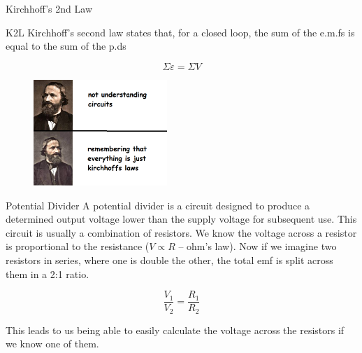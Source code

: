 \documentclass[../Main.tex]{subfiles}
\begin{document}
\begin{frame}{Kirchhoff's 2nd Law}
    \begin{block}{K2L}
    Kirchhoff's second law states that, for a closed loop, the sum of the e.m.fs is equal to the sum of the p.ds
    
    \begin{equation*}
        \Sigma \varepsilon = \Sigma V
    \end{equation*}
    \end{block}
    
    \begin{figure}
        \centering
        \includegraphics[height=4cm]{Electricity_Images/kirchoffs_laws_meme.png}
    \end{figure}
\end{frame}

\begin{frame}{Potential Divider}
    A potential divider is a circuit designed to produce a determined output voltage lower than the supply voltage for subsequent use. This circuit is usually a combination of resistors. 
    \newline
    \pause
    \newline
   We know the voltage across a resistor is proportional to the resistance ($V\propto R$ -- ohm's law). Now if we imagine two resistors in series, where one is double the other, the total emf is split across them in a 2:1 ratio. 
   
   \begin{equation*}
       \frac{V_1}{V_2} = \frac{R_1}{R_2}
   \end{equation*}
   
   This leads to us being able to easily calculate the voltage across the resistors if we know one of them. 
\end{frame}
\end{document}
